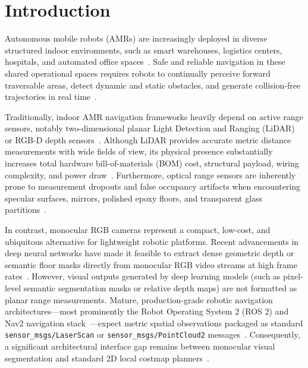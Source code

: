 \documentclass{ieeeaccess}
\begin{document}
\maketitle

\section{Introduction}
\label{sec:introduction}

Autonomous mobile robots (AMRs) are increasingly deployed in diverse structured indoor environments, such as smart warehouses, logistics centers, hospitals, and automated office spaces~\cite{gvrnextgenerationtechnologiesresearchteam_2026_autonomous,liu_2024_a}. Safe and reliable navigation in these shared operational spaces requires robots to continually perceive forward traversable areas, detect dynamic and static obstacles, and generate collision-free trajectories in real time~\cite{macenski_2020_the,yang_2019_semantic}.

Traditionally, indoor AMR navigation frameworks heavily depend on active range sensors, notably two-dimensional planar Light Detection and Ranging (LiDAR) or RGB-D depth sensors~\cite{li_2020_lidar,yusuf_2022_iotbased}. Although LiDAR provides accurate metric distance measurements with wide fields of view, its physical presence substantially increases total hardware bill-of-materials (BOM) cost, structural payload, wiring complexity, and power draw~\cite{liu_2024_a}. Furthermore, optical range sensors are inherently prone to measurement dropouts and false occupancy artifacts when encountering specular surfaces, mirrors, polished epoxy floors, and transparent glass partitions~\cite{deepthadamodaran_2023_experimental,yang_2011_on,tibebu_2021_lidarbased,sajjan_2020_clear,singh_2020_multidata}.

In contrast, monocular RGB cameras represent a compact, low-cost, and ubiquitous alternative for lightweight robotic platforms. Recent advancements in deep neural networks have made it feasible to extract dense geometric depth or semantic floor masks directly from monocular RGB video streams at high frame rates~\cite{shariqfarooqbhat_2021_adabins,ranftl_2021_vision,ultralytics_2024_ultralytics}. However, visual outputs generated by deep learning models (such as pixel-level semantic segmentation masks or relative depth maps) are not formatted as planar range measurements. Mature, production-grade robotic navigation architectures---most prominently the Robot Operating System 2 (ROS 2) and Nav2 navigation stack~\cite{macenski_2022_robot,macenski_2023_from}---expect metric spatial observations packaged as standard \texttt{sensor\_msgs/LaserScan} or \texttt{sensor\_msgs/PointCloud2} messages~\cite{openrobotics_sensor_msgslaserscan}. Consequently, a significant architectural interface gap remains between monocular visual segmentation and standard 2D local costmap planners~\cite{openrobotics_2020_depthimage_to_laserscan,opennavigationllc_2023_costmap}.
\end{document}

